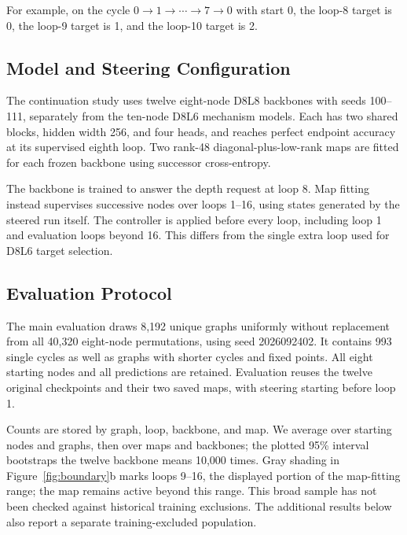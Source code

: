 \documentclass{article}
\begin{document}
For example, on the cycle $0\to1\to\cdots\to7\to0$ with start 0, the loop-8 target is 0, the loop-9 target is 1, and the loop-10 target is 2.

\subsection{Model and Steering Configuration}
The continuation study uses twelve eight-node D8L8 backbones with seeds 100--111, separately from the ten-node D8L6 mechanism models. Each has two shared blocks, hidden width 256, and four heads, and reaches perfect endpoint accuracy at its supervised eighth loop. Two rank-48 diagonal-plus-low-rank maps are fitted for each frozen backbone using successor cross-entropy.

The backbone is trained to answer the depth request at loop 8. Map fitting instead supervises successive nodes over loops 1--16, using states generated by the steered run itself. The controller is applied before every loop, including loop 1 and evaluation loops beyond 16. This differs from the single extra loop used for D8L6 target selection.

\subsection{Evaluation Protocol}
The main evaluation draws 8,192 unique graphs uniformly without replacement from all 40,320 eight-node permutations, using seed 2026092402. It contains 993 single cycles as well as graphs with shorter cycles and fixed points. All eight starting nodes and all predictions are retained. Evaluation reuses the twelve original checkpoints and their two saved maps, with steering starting before loop 1.

Counts are stored by graph, loop, backbone, and map. We average over starting nodes and graphs, then over maps and backbones; the plotted 95\% interval bootstraps the twelve backbone means 10,000 times. Gray shading in Figure~\ref{fig:boundary}b marks loops 9--16, the displayed portion of the map-fitting range; the map remains active beyond this range. This broad sample has not been checked against historical training exclusions. The additional results below also report a separate training-excluded population.
\end{document}
